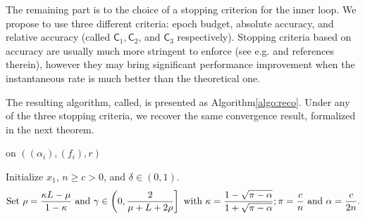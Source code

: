 The remaining part is to the choice of a stopping criterion for the inner loop. We propose to use three different criteria: epoch budget, absolute accuracy, and relative accuracy (called $\mathsf{C}_1, \mathsf{C}_2$, and $\mathsf{C}_3$ respectively). Stopping criteria based on accuracy are usually much more stringent to enforce (see e.g. \cite[Sec.~2.3]{lin2017catalyst} and references therein), however they may bring significant performance improvement when the instantaneous rate is much better than the theoretical one. 

The resulting algorithm, called\;\recoalgo, is presented as Algorithm\;\ref{algo:reco}. Under any of the three stopping criteria, we recover the same convergence result, formalized in the next theorem.

\begin{algorithm}[]
\caption{\label{algo:reco}\recoalgo on $((\alpha_i),(f_i),r)$}
Initialize $x_1$, $n\geq c>0$, and $\delta\in(0,1)$.
\begin{align}
\label{eq:set}
 \text{Set } \rho = \frac{\kappa L-\mu}{1-\kappa} \text{ and } \gamma \in \left( 0, \frac{2}{\mu+L+2\rho} \right] \text{ with } \kappa = \frac{1-\sqrt{\pi -\alpha}}{1+\sqrt{\pi-\alpha}}; \pi = \frac{c}{n} \text{ and } \alpha = \frac{c}{2n}.
\end{align}
\end{algorithm}
